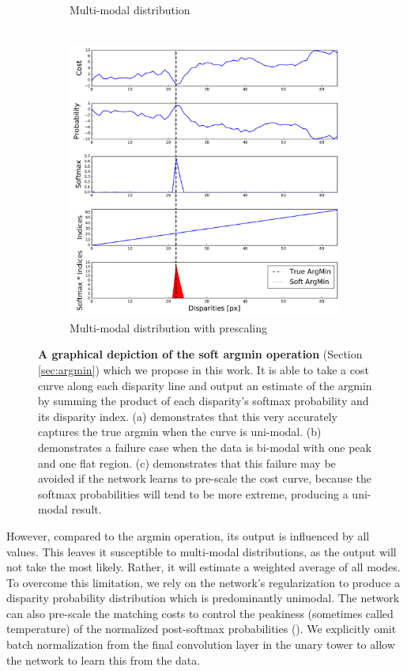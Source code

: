 \begin{figure}[t]
\begin{center}
\begin{subfigure}[b]{0.32\linewidth}
	        \caption{Multi-modal distribution\\~}
		\end{subfigure}
    		\begin{subfigure}[b]{0.32\linewidth}
			\includegraphics[width=\linewidth]{argmin/soft_argmin_multimodal_prescaling.pdf}
	        \caption{Multi-modal distribution with prescaling}
		\end{subfigure}
	\end{center}
	\caption[A graphical depiction of the soft argmin operation.]{\textbf{A graphical depiction of the soft argmin operation} (Section \ref{sec:argmin}) which we propose in this work. It is able to take a cost curve along each disparity line and output an estimate of the argmin by summing the product of each disparity's softmax probability and its disparity index. (a) demonstrates that this very accurately captures the true argmin when the curve is uni-modal. (b) demonstrates a failure case when the data is bi-modal with one peak and one flat region. (c) demonstrates that this failure may be avoided if the network learns to pre-scale the cost curve, because the softmax probabilities will tend to be more extreme, producing a uni-modal result.}
	\label{fig:argmin}
\end{figure}

However, compared to the argmin operation, its output is influenced by all values. This leaves it susceptible to multi-modal distributions, as the output will not take the most likely. Rather, it will estimate a weighted average of all modes. To overcome this limitation, we rely on the network's regularization to produce a disparity probability distribution which is predominantly unimodal. The network can also pre-scale the matching costs to control the peakiness (sometimes called temperature) of the normalized post-softmax probabilities (). We explicitly omit batch normalization from the final convolution layer in the unary tower to allow the network to learn this from the data.

